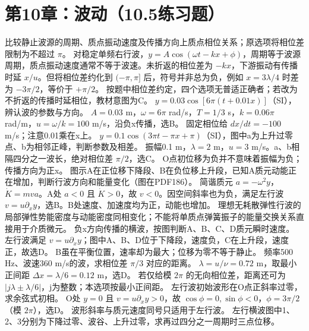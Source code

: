 \section{第10章：波动（10.5练习题）}
\problemtext 比较静止波源的周期、质点振动速度及传播方向上质点相位关系；原选项将相位差限制为不超过 $\pi$。
\workings 对稳定单频右行波，$y=A\cos(\omega t-kx+\phi)$，周期等于波源周期，质点振动速度通常不等于波速。未折返的相位差为 $-kx$，下游振动有传播时延 $x/u$。但将相位差约化到 $(-\pi,\pi]$ 后，符号并非总为负，例如 $x=3\lambda/4$ 时差为 $-3\pi/2$，等价于 $+\pi/2$。
\crosscheck 按题中相位差约定，四个选项无普适正确者；若改为不折返的传播时延相位，教材意图为C。
\problemtext $y=0.03\cos[6\pi(t+0.01x)]$（SI），辨认波的参数与方向。
\workings $A=0.03$ m，$\omega=6\pi$ rad/s，$T=1/3$ s，$k=0.06\pi$ rad/m，$u=\omega/k=100$ m/s，沿负x传播，选B。
\crosscheck 固定相位给 $dx/dt=-100$ m/s；注意0.01乘在x上。
\problemtext $y=0.1\cos(3\pi t-\pi x+\pi)$（SI），图中a为上升过零点、b为相邻正峰，判断参数及相差。
\workings 振幅0.1 m，$\lambda=2$ m，$u=3$ m/s。a、b相隔四分之一波长，绝对相位差 $\pi/2$，选C。
\crosscheck O点初位移为负并不意味着振幅为负；传播方向为正x。
\problemtext 图示A在正位移下降段、B在负位移上升段，已知A质元动能正在增加，判断行波方向和能量变化（图在PDF186）。
\workings 简谐质元 $a=-\omega^2y$，$\dot K=mva$。A处 $a<0$ 且 $\dot K>0$，故 $v<0$。因空间斜率也为负，满足左行波 $v=u\partial_x y$，选B。B处速度、加速度均为正，动能也增加。
\crosscheck 理想无耗散弹性行波的局部弹性势能密度与动能密度同相变化；不能将单质点弹簧振子的能量交换关系直接用于介质微元。
\problemtext 负x方向传播的横波，按图判断A、B、C、D质元瞬时速度。
\workings 左行波满足 $v=u\partial_x y$；图中A、B、D位于下降段，速度负，C在上升段，速度正，故选D。
\crosscheck B虽在平衡位置，速率却为最大；位移为零不等于静止。
\problemtext 频率500 Hz、波速360 m/s的波，求相位差 $\pi/3$ 对应的距离。
\workings $\lambda=u/\nu=0.72$ m，取最小正间距 $\Delta x=\lambda/6=0.12$ m，选D。
\crosscheck 若仅给模 $2\pi$ 的无向相位差，距离还可为 $|j\lambda\pm\lambda/6|$，j为整数；本选项按最小正间距。
\problemtext 左行波初始波形在O点正斜率过零，求余弦式初相。
\workings O处 $y=0$ 且 $v=u\partial_x y>0$，故 $\cos\phi=0,\sin\phi<0$，$\phi=3\pi/2$（模 $2\pi$），选D。
\crosscheck 波形斜率与质元速度同号只适用于左行波。
\problemtext 左行横波图中1、2、3分别为下降过零、波谷、上升过零，求再过四分之一周期时三点位移。
